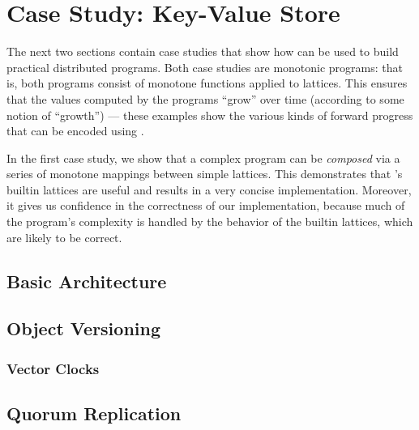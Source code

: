 \section{Case Study: Key-Value Store}
\label{sec:kvs}
The next two sections contain case studies that show how \lang can be used to
build practical distributed programs. Both case studies are monotonic programs:
that is, both programs consist of monotone functions applied to lattices. This
ensures that the values computed by the programs ``grow'' over time (according
to some notion of ``growth'') --- these examples show the various kinds of
forward progress that can be encoded using \lang.

In the first case study, we show that a complex program can be \emph{composed}
via a series of monotone mappings between simple lattices. This demonstrates
that \lang's builtin lattices are useful and results in a very concise
implementation. Moreover, it gives us confidence in the correctness of our
implementation, because much of the program's complexity is handled by the
behavior of the builtin lattices, which are likely to be correct.

\subsection{Basic Architecture}

\subsection{Object Versioning}

\subsubsection{Vector Clocks}

\subsection{Quorum Replication}
